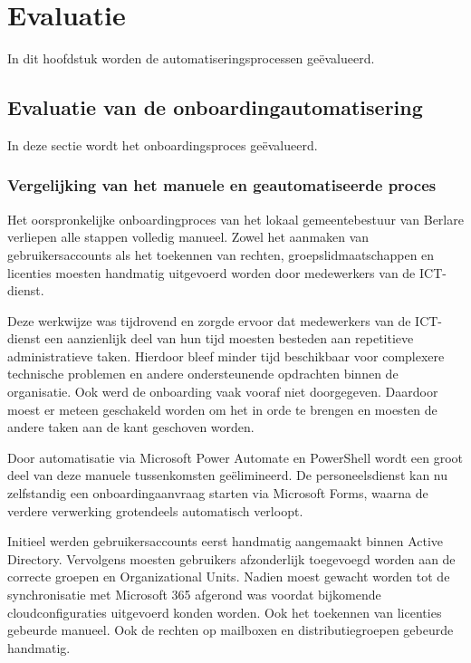 
\chapter{Evaluatie}
\label{ch:Evaluatie}

In dit hoofdstuk worden de automatiseringsprocessen geëvalueerd.

\section{Evaluatie van de onboardingautomatisering}

In deze sectie wordt het onboardingsproces geëvalueerd.

\subsection{Vergelijking van het manuele en geautomatiseerde proces}

Het oorspronkelijke onboardingproces van het lokaal gemeentebestuur van Berlare verliepen alle stappen volledig manueel. Zowel het aanmaken van gebruikersaccounts als het toekennen van rechten, groepslidmaatschappen en licenties moesten handmatig uitgevoerd worden door medewerkers van de ICT-dienst.

Deze werkwijze was tijdrovend en zorgde ervoor dat medewerkers van de ICT-dienst een aanzienlijk deel van hun tijd moesten besteden aan repetitieve administratieve taken. Hierdoor bleef minder tijd beschikbaar voor complexere technische problemen en andere ondersteunende opdrachten binnen de organisatie. Ook werd de onboarding vaak vooraf niet doorgegeven. Daardoor moest er meteen geschakeld worden om het in orde te brengen en moesten de andere taken aan de kant geschoven worden. 

Door automatisatie via Microsoft Power Automate en PowerShell wordt een groot deel van deze manuele tussenkomsten geëlimineerd. De personeelsdienst kan nu zelfstandig een onboardingaanvraag starten via Microsoft Forms, waarna de verdere verwerking grotendeels automatisch verloopt.

Initieel werden gebruikersaccounts eerst handmatig aangemaakt binnen Active Directory. Vervolgens moesten gebruikers afzonderlijk toegevoegd worden aan de correcte groepen en Organizational Units. Nadien moest gewacht worden tot de synchronisatie met Microsoft 365 afgerond was voordat bijkomende cloudconfiguraties uitgevoerd konden worden. Ook het toekennen van licenties gebeurde manueel. Ook de rechten op mailboxen en distributiegroepen gebeurde handmatig.


